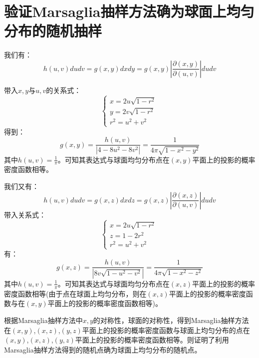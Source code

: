 \documentclass[a4paper,11pt]{article}
\begin{document}
\section{验证Marsaglia抽样方法确为球面上均匀分布的随机抽样}

我们有：
\begin{equation}
	h(u,v)dudv = g(x,y)dxdy = g(x,y)\left| \frac{\partial(x,y)}{\partial(u,v)} \right| du dv
\end{equation}

带入$x,y$与$u,v$的关系式：
\begin{equation}
\left\{
\begin{array}{l}
	x = 2u \sqrt{1 − r^{2} }\\
	y = 2v \sqrt{1 − r^{2} } \\
	r^{2} = u^{2}+v^{2}
\end{array}
\right.
\end{equation}
得到：
\begin{equation}
	g(x,y) = \frac{h(u,v)}{|4 - 8 u^{2} - 8 v^{2}|} = \frac{1}{4\pi\sqrt{1-x^{2}-y^{2}}}
\end{equation}
其中$h(u,v) = \frac{1}{\pi}$。可知其表达式与球面均匀分布点在$(x,y)$平面上的投影的概率密度函数相等。

我们又有：
\begin{equation}
	h(u,v)dudv = g(x,z)dxdz = g(x,z)\left| \frac{\partial(x,z)}{\partial(u,v)} \right| du dv
\end{equation}
带入关系式：
\begin{equation}
\left\{
\begin{array}{l}
	x = 2u \sqrt{1 − r^{2} }\\
	z = 1-2r^{2} \\
	r^{2} = u^{2}+v^{2}
\end{array}
\right.
\end{equation}
有：
\begin{equation}
	g(x,z) = \frac{h(u,v)}{|8v\sqrt{1-u^{2}-v^{2}}|} = \frac{1}{4\pi\sqrt{1-x^{2}-z^{2}}}
\end{equation}
其中$h(u,v) = \frac{1}{\pi}$。可知其表达式与球面均匀分布点在$(x,z)$平面上的投影的概率密度函数相等(由于点在球面上均匀分布，则在$(x,z)$平面上的投影的概率密度函数与在$(x,y)$平面上的投影的概率密度函数相等)。


根据Marsaglia抽样方法中$x,y$的对称性，球面的对称性，得到Marsaglia抽样方法在$(x,y)$,$(x,z)$,$(y,z)$平面上的投影的概率密度函数与球面上均匀分布的点在$(x,y)$,$(x,z)$,$(y,z)$平面上的投影的概率密度函数相等。则证明了利用Marsaglia抽样方法得到的随机点确为球面上均匀分布的随机点。
\end{document}
